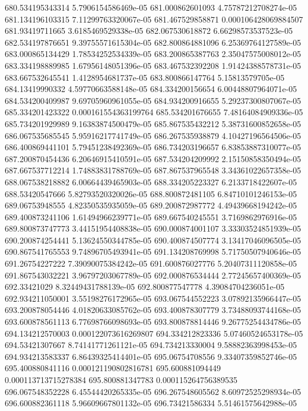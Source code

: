 {680.534195343314 5.7906154586469e-05
681.000862601093 4.75787212708274e-05
681.134196103315 7.11299763320067e-05
681.467529858871 0.000106428069884507
681.93419711665 3.6185469529338e-05
682.067530618872 6.66298573537523e-05
682.534197876651 9.39755571615304e-05
682.800864881096 6.25369764127589e-05
683.000865134429 1.78534252534339e-05
683.200865387763 2.35047575008012e-05
683.334198889985 1.67956148051396e-05
683.467532392208 1.91424388578731e-05
683.667532645541 1.4128954681737e-05
683.800866147764 5.15813579705e-05
684.13419990332 4.59770663588148e-05
684.334200156654 6.00448807964071e-05
684.534200409987 9.69705960961055e-05
684.934200916655 5.29237300807067e-05
685.334201423322 0.000161554363199764
685.534201676655 7.48164084909336e-05
685.734201929989 9.16383874500479e-05
685.867535432212 5.38731600852658e-05
686.067535685545 5.95916217741749e-05
686.267535938879 4.10427196564506e-05
686.400869441101 5.79451238492369e-05
686.734203196657 6.83853887310077e-05
687.200870454436 6.20646915410591e-05
687.534204209992 2.15150858350494e-05
687.667537712214 1.74883831788769e-05
687.867537965548 3.34361022657358e-05
688.067538218882 6.00664439465903e-05
688.334205223327 6.2133718422607e-05
688.53420547666 5.82793520320026e-05
688.800872481105 6.84710101246153e-05
689.06753948555 4.82350535935059e-05
689.200872987772 4.49439668194242e-05
689.400873241106 1.61494966239771e-05
689.667540245551 3.7169862976916e-05
689.800873747773 3.44151954408838e-05
690.000874001107 3.33303524851939e-05
690.200874254441 5.13624550344785e-05
690.400874507774 3.13417046096505e-05
690.867541765553 9.74896705493941e-05
691.134208769998 5.71750507940646e-05
691.26754227222 7.39090075384242e-05
691.600876027776 5.20407311120858e-05
691.867543032221 3.96797203067789e-05
692.000876534444 2.77245657400369e-05
692.33421029 8.32449431788139e-05
692.800877547778 4.39084704236051e-05
692.934211050001 3.55198276172965e-05
693.067544552223 3.07892135966447e-05
693.200878054446 4.01820633085762e-05
693.400878307779 3.73488093744168e-05
693.600878561113 6.77698766098693e-05
693.800878814446 9.26775254434786e-05
694.134212570003 0.000122073616269807
694.334212823336 5.07460524653178e-05
694.53421307667 8.74141771261121e-05
694.734213330004 9.58882363998453e-05
694.934213583337 6.86439325414401e-05
695.06754708556 9.33407359852746e-05
695.400880841116 0.000121190802816781
695.600881094449 0.000113713715278384
695.800881347783 0.000115264756389535
696.067548352228 6.45544420265335e-05
696.267548605562 8.60972525298934e-05
696.600882361118 5.96609667801132e-05
696.73421586334 5.51461575642988e-05
}
